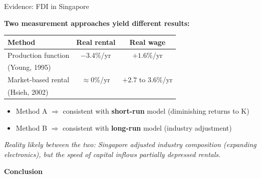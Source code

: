 \documentclass{beamer}
\begin{document}
\begin{frame}{Evidence: FDI in Singapore}

\textbf{Two measurement approaches yield different results:}

\vspace{0.2cm}

\begin{center}
\small
\begin{tabular}{lcc}
\toprule
\textbf{Method} & \textbf{Real rental} & \textbf{Real wage} \\
\midrule
Production function & $-3.4\%$/yr & $+1.6\%$/yr \\
(Young, 1995) & & \\
\midrule
Market-based rental & $\approx 0\%$/yr & $+2.7$ to $3.6\%$/yr \\
(Hsieh, 2002) & & \\
\bottomrule
\end{tabular}
\end{center}

\vspace{0.3cm}

\begin{itemize}
    \item Method A $\Rightarrow$ consistent with \textbf{short-run} model (diminishing returns to K)
    \item Method B $\Rightarrow$ consistent with \textbf{long-run} model (industry adjustment)
\end{itemize}

\vspace{0.2cm}

\textit{Reality likely between the two: Singapore adjusted industry composition (expanding electronics), but the speed of capital inflows partially depressed rentals.}

\end{frame}

\fi



\begin{frame}

\vspace{2cm}

\centering
{\LARGE \textbf{Conclusion}}

\vfill

\end{frame}


\end{document}
